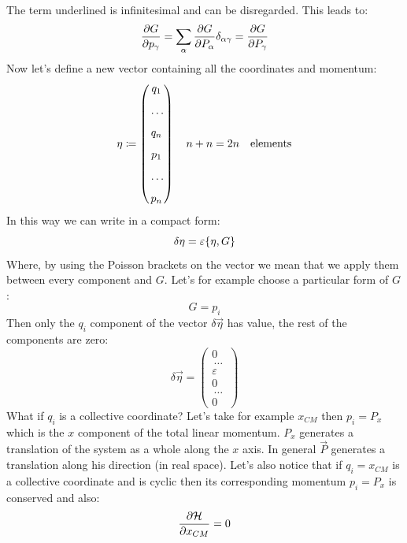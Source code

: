 The term underlined is infinitesimal and can be disregarded. This leads to:
\begin{equation}
    \pdv{G}{p_{\gamma}} = \bigsum_{\alpha} \pdv{G}{P_{\alpha}}\delta_{\alpha \gamma} = \pdv{G}{P_{\gamma}}
\end{equation}
Now let's define a new vector containing all the coordinates and momentum:
\begin{equation}
    \vb{\eta} \coloneqq \begin{pmatrix}
        q_1\\[8pt] \,\dots\, \\[8pt]q_n\\[8pt]p_1\\[8pt] \,\dots\, \\[8pt]p_n
    \end{pmatrix}
    \quad n+n = 2n \quad \text{elements}
\end{equation}
In this way we can write in a compact form:
\begin{equation}
    \delta \vec{\eta} = \varepsilon \pb{\eta}{G}
\end{equation}
Where, by using the Poisson brackets on the vector we mean that we apply them between every component and $G$. Let's for example choose a particular form of $G$:
\begin{equation}
    G = p_i
\end{equation}
Then only the $q_i$ component of the vector $\delta \vec{\eta}$ has value, the rest of the components are zero:
\begin{equation}
    \delta \vec{\eta} = \begin{pmatrix}
        0\\[8pt] \,\dots\, \\[8pt]\varepsilon\\[8pt]0\\[8pt] \,\dots\, \\[8pt]0
    \end{pmatrix}
\end{equation}
What if $q_i$ is a collective coordinate? Let's take for example $x_{CM}$ then $p_i = P_x$ which is the $x$ component of the total linear momentum. $P_x$ generates a translation of the system as a whole along the $x$ axis. In general $\vec{P}$ generates a translation along his direction (in real space). Let's also notice that if $q_i = x_{CM}$ is a collective coordinate and is cyclic then its corresponding momentum $p_i = P_x$ is conserved and also:
\begin{equation}
  \pdv{\hamfun}{x_{CM}}=0
\end{equation}

